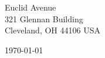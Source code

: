 \begin{minipage}{0.49\textwidth}
\begin{flushleft}
   Euclid Avenue\\
321 Glennan Building\\
Cleveland, OH 44106 USA
\end{flushleft}
\end{minipage}
\begin{minipage}{0.47\textwidth}
\begin{flushright}
\today
\end{flushright}
\end{minipage} \\

\newcommand{\univ}{Case Western Reserve University}
\newcommand{\univshort}{Case}
\newcommand{\degree}{Ph.D.}
\newcommand{\dept}{Computer Science}

